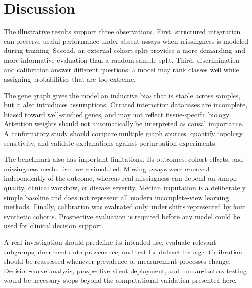 \section{Discussion}

The illustrative results support three observations. First, structured integration
can preserve useful performance under absent assays when missingness is modeled
during training. Second, an external-cohort split provides a more demanding and
more informative evaluation than a random sample split. Third, discrimination
and calibration answer different questions: a model may rank classes well while
assigning probabilities that are too extreme.

The gene graph gives the model an inductive bias that is stable across samples,
but it also introduces assumptions. Curated interaction databases are incomplete,
biased toward well-studied genes, and may not reflect tissue-specific biology.
Attention weights should not automatically be interpreted as causal importance.
A confirmatory study should compare multiple graph sources, quantify topology
sensitivity, and validate explanations against perturbation experiments.

The benchmark also has important limitations. Its outcomes, cohort effects, and
missingness mechanism were simulated. Missing assays were removed independently
of the outcome, whereas real missingness can depend on sample quality, clinical
workflow, or disease severity. Median imputation is a deliberately simple
baseline and does not represent all modern incomplete-view learning methods.
Finally, calibration was evaluated only under shifts represented by four
synthetic cohorts. Prospective evaluation is required before any model could be
used for clinical decision support.

A real investigation should predefine its intended use, evaluate relevant
subgroups, document data provenance, and test for dataset leakage. Calibration
should be reassessed whenever prevalence or measurement processes change.
Decision-curve analysis, prospective silent deployment, and human-factors testing
would be necessary steps beyond the computational validation presented here.
